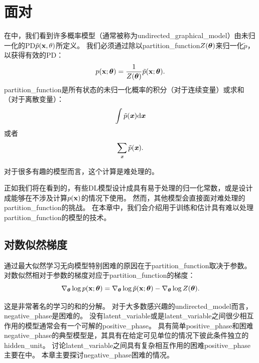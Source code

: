 \chapter{面对}
\label{chap:confronting_the_partition_function}
在中，我们看到许多概率模型（通常被称为\gls{undirected_graphical_model}）由未归一化的\gls{PD}$\tilde{p}(\mathbf{x}, \theta)$所定义。
我们必须通过除以\gls{partition_function}$Z(\boldsymbol{\theta})$来归一化$\tilde{p}$，以获得有效的\gls{PD}：
\begin{equation}
	p(\mathbf{x}; \boldsymbol{\theta}) = \frac{1}{Z(\boldsymbol{\theta})} \tilde{p}(\mathbf{x}; \boldsymbol{\theta}).
\end{equation}
\gls{partition_function}是所有状态的未归一化概率的积分（对于连续变量）或求和（对于离散变量）：
\begin{equation}
	\int \tilde{p}(\boldsymbol{\mathit{x}}) \mathrm{d} \boldsymbol{\mathit{x}}
\end{equation}
或者
\begin{equation}
	\sum_{\boldsymbol{\mathit{x}}} \tilde{p} (\boldsymbol{\mathit{x}}).
\end{equation}


对于很多有趣的模型而言，这个计算是难处理的。


正如我们将在看到的，有些\gls{DL}模型设计成具有易于处理的归一化常数，或是设计成能够在不涉及计算$p(\mathbf{x})$的情况下使用。
然而，其他模型会直接面对难处理的\gls{partition_function}的挑战。
在本章中，我们会介绍用于训练和估计具有难以处理\gls{partition_function}的模型的技术。


\section{对数似然梯度}
\label{sec:the_log_likelihood_gradient}
通过最大似然学习无向模型特别困难的原因在于\gls{partition_function}取决于参数。
对数似然相对于参数的梯度对应于\gls{partition_function}的梯度：
\begin{equation}
	\nabla_{\boldsymbol{\theta}} \log p(\mathbf{x}; \boldsymbol{\theta}) = \nabla_{\boldsymbol{\theta}} \log \tilde{p}(\mathbf{x}; \boldsymbol{\theta}) -
\nabla_{\boldsymbol{\theta}} \log Z(\boldsymbol{\theta}).
\end{equation}


这是非常著名的学习的和的分解。
对于大多数感兴趣的\gls{undirected_model}而言，\gls{negative_phase}是困难的。
没有\gls{latent_variable}或是\gls{latent_variable}之间很少相互作用的模型通常会有一个可解的\gls{positive_phase}。
具有简单\gls{positive_phase}和困难\gls{negative_phase}的典型模型是，其具有在给定可见单位的情况下彼此条件独立的\gls{hidden_unit}。
讨论\gls{latent_variable}之间具有复杂相互作用的困难\gls{positive_phase}主要在中。
本章主要探讨\gls{negative_phase}困难的情况。


